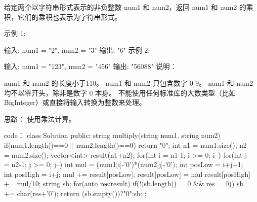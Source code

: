 给定两个以字符串形式表示的非负整数 num1 和 num2，返回 num1 和 num2 的乘积，它们的乘积也表示为字符串形式。

示例 1:

输入: num1 = "2", num2 = "3"
输出: "6"
示例 2:

输入: num1 = "123", num2 = "456"
输出: "56088"
说明：

num1 和 num2 的长度小于110。
num1 和 num2 只包含数字 0-9。
num1 和 num2 均不以零开头，除非是数字 0 本身。
不能使用任何标准库的大数类型（比如 BigInteger）或直接将输入转换为整数来处理。




















思路：
使用乘法计算。






















code：
class Solution {
public:
    string multiply(string num1, string num2) {
        if(num1.length()==0 || num2.length()==0) return "0";
        int n1 = num1.size(), n2 = num2.size();
        vector<int> result(n1+n2);
        for(int i = n1-1; i >= 0; i--)
        {
            for(int j = n2-1; j >= 0; j--)
            {
                int mul = (num1[i]-'0')*(num2[j]-'0');
                int posLow = i+j+1;
                int posHigh = i+j;
                mul += result[posLow];
                result[posLow] = mul%
                result[posHigh] += mul/10;
            }
        }
        string sb;
        for(auto res:result)
        {
            if(!(sb.length()==0 && res==0)) sb += char(res+'0');
        }
        return (sb.empty())?"0":sb;
    }
};